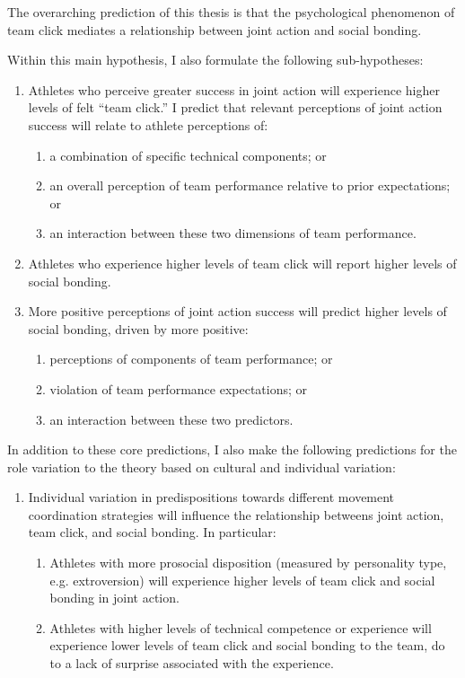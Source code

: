 \begin{CJK}{UTF8}{gbsn}
    The overarching prediction of this thesis is that the psychological phenomenon of team click mediates a relationship between joint action and social bonding.

    Within this main hypothesis, I also formulate the following sub-hypotheses:
    \begin{enumerate}
      \item Athletes who perceive greater success in joint action will experience higher levels of felt ``team click.'' I predict that relevant perceptions of joint action success will relate to athlete perceptions of:
        \begin{enumerate}
          \item a combination of specific technical components; or
          \item an overall perception of team performance relative to prior expectations; or
          \item an interaction between these two dimensions of team performance.
        \end{enumerate}
      \item Athletes who experience higher levels of team click will report higher levels of social bonding.
      \item More positive perceptions of joint action success will predict higher levels of social bonding, driven by more positive:
      \begin{enumerate}
        \item perceptions of components of team performance; or
        \item violation of team performance expectations; or
        \item an interaction between these two predictors.
      \end{enumerate}
    \end{enumerate}

In addition to these core predictions, I also make the following predictions for the role variation to the theory based on cultural and individual variation:

\begin{enumerate}
  \item Individual variation in predispositions towards different movement coordination strategies will influence the relationship betweens joint action, team click, and social bonding.  In particular:
      \begin{enumerate}
        \item Athletes with more prosocial disposition (measured by personality type, e.g. extroversion) will experience higher levels of team click and social bonding in joint action.
        \item Athletes with higher levels of technical competence or experience will experience lower levels of team click and social bonding to the team, do to a lack of surprise associated with the experience.
      \end{enumerate}


\end{enumerate}
\end{CJK}
